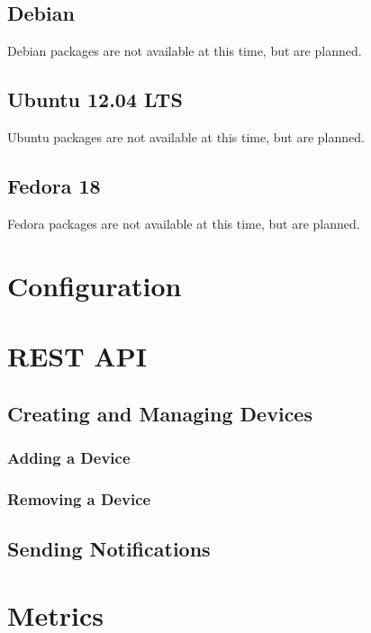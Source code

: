 \documentclass[12pt]{article}
\begin{document}
\subsection{Debian}

Debian packages are not available at this time, but are planned.

\subsection{Ubuntu 12.04 LTS}

Ubuntu packages are not available at this time, but are planned.

\subsection{Fedora 18}

Fedora packages are not available at this time, but are planned.

\section{Configuration}

\section{REST API}

\subsection{Creating and Managing Devices}

\subsubsection{Adding a Device}

\subsubsection{Removing a Device}

\subsection{Sending Notifications}

\section{Metrics}
\end{document}
